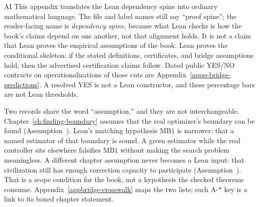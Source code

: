 \begin{authbar}{AI}
This appendix translates the Lean dependency spine into ordinary mathematical language. The file and label names still say ``proof spine''; the reader-facing name is \emph{dependency spine}, because what Lean checks is how the book's claims depend on one another, not that alignment holds.
It is not a claim that Lean proves the empirical assumptions of the book.
Lean proves the conditional skeleton: if the stated definitions, certificates, and bridge assumptions hold, then the advertised certification claims follow.
Dated public YES/NO contracts on operationalizations of those cuts are Appendix~\ref{appp-bridge-predictions}.
A resolved YES is not a Lean constructor, and these percentage bars are not Lean thresholds.

Two records share the word ``assumption,'' and they are not interchangeable.
Chapter~\ref{ch:finding-boundary} assumes that the real optimizer's boundary can be found (Assumption~).
Lean's matching hypothesis \(\text{MB1}\) is narrower: that a named estimator of that boundary is sound.
A green estimator while the real controller sits elsewhere falsifies \(\text{MB1}\) without making the search problem meaningless.
A different chapter assumption never becomes a Lean input: that civilization still has enough correction capacity to participate (Assumption~).
That is a scope condition for the book, not a hypothesis the checked theorems consume.
Appendix~\ref{appbridge-crosswalk} maps the two lists; each \(\text{A-*}\) key is a link to its boxed chapter statement.


\end{authbar}
